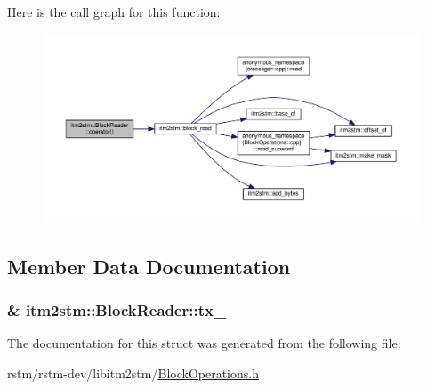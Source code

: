Here is the call graph for this function\-:
\nopagebreak
\begin{figure}[H]
\begin{center}
\leavevmode
\includegraphics[width=350pt]{structitm2stm_1_1BlockReader_a967b0c639adba84b3e30e4b47b332136_cgraph}
\end{center}
\end{figure}




\subsection{Member Data Documentation}
\hypertarget{structitm2stm_1_1BlockReader_ab9d0a4c731a6fd2127694dfe080bac53}{
\subsubsection[{tx\-\_\-}]{\& itm2stm\-::\-Block\-Reader\-::tx\-\_\-}}\label{structitm2stm_1_1BlockReader_ab9d0a4c731a6fd2127694dfe080bac53}


The documentation for this struct was generated from the following file\-:\begin{DoxyCompactItemize}
\item 
rstm/rstm-\/dev/libitm2stm/\hyperlink{BlockOperations_8h}{Block\-Operations.\-h}\end{DoxyCompactItemize}
